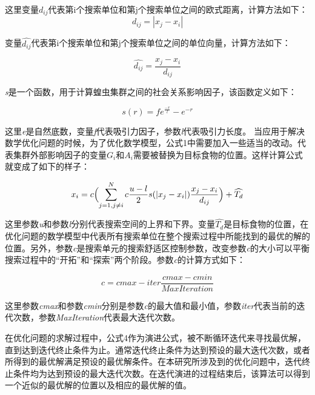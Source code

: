 这里变量$d_{ij}$代表第i个搜索单位和第j个搜索单位之间的欧式距离，计算方法如下：
\begin{equation}
    d_{ij}=|x_j-x_i|
\end{equation}

变量$\widehat{d_{ij}}$代表第i个搜索单位和第j个搜索单位之间的单位向量，计算方法如下：

\begin{equation}
    \widehat{d_{ij}}=\frac{x_j-x_i}{d_{ij}}
\end{equation}

\emph{s}是一个函数，用于计算蝗虫集群之间的社会关系影响因子，该函数定义如下：

\begin{equation}
    s(r) = fe^{\frac{-r}{l}}-e^{-r}
\end{equation}

这里\emph{e}是自然底数，变量\emph{f}代表吸引力因子，参数\emph{l}代表吸引力长度。
当应用于解决数学优化问题的时候，为了优化数学模型，公式1中需要加入一些适当的改动。代表集群外部影响因子的变量$G_i$和$A_i$需要被替换为目标食物的位置。这样计算公式就变成了如下的样子：

\begin{equation}
    x_i = c \Bigl(\sum_{j=1,j\neq{i}}^N c \frac{u-l}{2}s (\lvert x_j-x_i \rvert )\frac{x_j-x_i}{d_{ij}} \Bigr) + \widehat{T_d}
\end{equation}

这里参数\emph{u}和参数\emph{l}分别代表搜索空间的上界和下界。变量$\widehat{T_d}$是目标食物的位置，在优化问题的数学模型中代表所有搜索单位在整个搜索过程中所能找到的最优的解的位置。另外，参数\emph{c}是搜索单元的搜索舒适区控制参数，改变参数\emph{c}的大小可以平衡搜索过程中的“开拓”和“探索”两个阶段。参数\emph{c}的计算方式如下：

\begin{equation}
    c = cmax - iter \frac{cmax - cmin}{MaxIteration}
\end{equation}


这里参数\emph{cmax}和参数\emph{cmin}分别是参数\emph{c}的最大值和最小值，参数\emph{iter}代表当前的迭代次数，参数\emph{MaxIteration}代表最大迭代次数。

在优化问题的求解过程中，公式4作为演进公式，被不断循环迭代来寻找最优解，直到达到迭代终止条件为止。通常迭代终止条件为达到预设的最大迭代次数，或者所得到的最优解满足预设的最优解条件。在本研究所涉及到的优化问题中，迭代终止条件均为达到预设的最大迭代次数。在迭代演进的过程结束后，该算法可以得到一个近似的最优解的位置以及相应的最优解的值。
